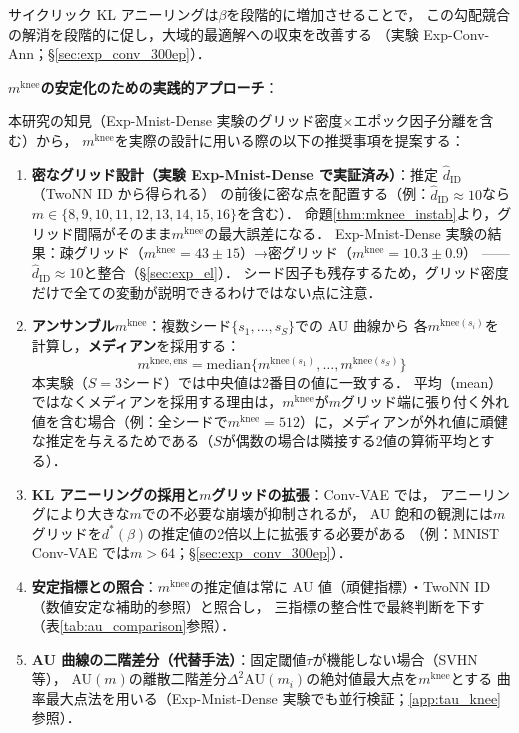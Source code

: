 \documentclass[11pt,a4paper]{jsarticle}
\newcommand{\mknee}{m^{\mathrm{knee}}}
\begin{document}
サイクリック KL アニーリング\cite{fu2019cyclical}は$\beta$を段階的に増加させることで，
この勾配競合の解消を段階的に促し，大域的最適解への収束を改善する
（実験 Exp-Conv-Ann；§\ref{sec:exp_conv_300ep}）．

\textbf{$\mknee$の安定化のための実践的アプローチ}：

本研究の知見（Exp-Mnist-Dense 実験のグリッド密度×エポック因子分離を含む）から，
$\mknee$を実際の設計に用いる際の以下の推奨事項を提案する：
\begin{enumerate}
  \item \textbf{密なグリッド設計（実験 Exp-Mnist-Dense で実証済み）}：推定 $\hat{d}_\mathrm{ID}$（TwoNN ID から得られる）
        の前後に密な点を配置する（例：$\hat{d}_\mathrm{ID} \approx 10$なら$m \in \{8,9,10,11,12,13,14,15,16\}$を含む）．
        命題\ref{thm:mknee_instab}より，グリッド間隔がそのまま$\mknee$の最大誤差になる．
        Exp-Mnist-Dense 実験の結果：疎グリッド（$\mknee=43\pm15$）→密グリッド（$\mknee=10.3\pm0.9$）
        —— $\hat{d}_\mathrm{ID} \approx 10$と整合（§\ref{sec:exp_el}）．
        シード因子も残存するため，グリッド密度だけで全ての変動が説明できるわけではない点に注意．
  \item \textbf{アンサンブル$\mknee$}：複数シード$\{s_1,\ldots,s_S\}$での AU 曲線から
        各$m^{\mathrm{knee}(s_i)}$を計算し，\textbf{メディアン}を採用する：
        \begin{equation}
          m^{\mathrm{knee,ens}} = \mathrm{median}\bigl\{m^{\mathrm{knee}(s_1)}, \ldots, m^{\mathrm{knee}(s_S)}\bigr\}
          \label{eq:mknee_ens}
        \end{equation}
        本実験（$S=3$シード）では中央値は2番目の値に一致する．
        平均（mean）ではなくメディアンを採用する理由は，$\mknee$が$m$グリッド端に張り付く外れ値を含む場合（例：全シードで$\mknee=512$）に，メディアンが外れ値に頑健な推定を与えるためである（$S$が偶数の場合は隣接する2値の算術平均とする）．
  \item \textbf{KL アニーリングの採用と$m$グリッドの拡張}：Conv-VAE では，
        アニーリングにより大きな$m$での不必要な崩壊が抑制されるが，
        AU 飽和の観測には$m$グリッドを$d^*(\beta)$の推定値の2倍以上に拡張する必要がある
        （例：MNIST Conv-VAE では$m > 64$；§\ref{sec:exp_conv_300ep}）．
  \item \textbf{安定指標との照合}：$\mknee$の推定値は常に AU 値（頑健指標）・TwoNN ID（数値安定な補助的参照）と照合し，
        三指標の整合性で最終判断を下す（表\ref{tab:au_comparison}参照）．
  \item \textbf{AU 曲線の二階差分（代替手法）}：固定閾値$\tau$が機能しない場合（SVHN 等），
        AU$(m)$の離散二階差分$\Delta^2\mathrm{AU}(m_i)$の絶対値最大点を$\mknee$とする
        曲率最大点法を用いる（Exp-Mnist-Dense 実験でも並行検証；\ref{app:tau_knee}参照）．
\end{enumerate}
\end{document}

